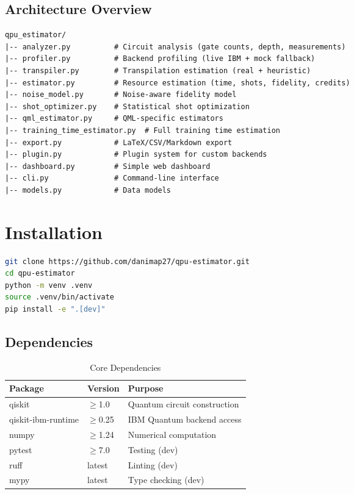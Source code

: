 \documentclass[11pt,a4paper]{article}
\begin{document}
\subsection{Architecture Overview}

\begin{lstlisting}[language=TeX,caption=Package Structure]
qpu_estimator/
|-- analyzer.py          # Circuit analysis (gate counts, depth, measurements)
|-- profiler.py          # Backend profiling (live IBM + mock fallback)
|-- transpiler.py        # Transpilation estimation (real + heuristic)
|-- estimator.py         # Resource estimation (time, shots, fidelity, credits)
|-- noise_model.py       # Noise-aware fidelity model
|-- shot_optimizer.py    # Statistical shot optimization
|-- qml_estimator.py     # QML-specific estimators
|-- training_time_estimator.py  # Full training time estimation
|-- export.py            # LaTeX/CSV/Markdown export
|-- plugin.py            # Plugin system for custom backends
|-- dashboard.py         # Simple web dashboard
|-- cli.py               # Command-line interface
|-- models.py            # Data models
\end{lstlisting}

\section{Installation}

\begin{lstlisting}[language=bash,caption=Installation from Source]
git clone https://github.com/danimap27/qpu-estimator.git
cd qpu-estimator
python -m venv .venv
source .venv/bin/activate
pip install -e ".[dev]"
\end{lstlisting}

\subsection{Dependencies}

\begin{table}[htbp]
\centering
\caption{Core Dependencies}
\begin{tabular}{@{}lll@{}}
\toprule
\textbf{Package} & \textbf{Version} & \textbf{Purpose} \\
\midrule
qiskit & $\geq$1.0 & Quantum circuit construction \\
qiskit-ibm-runtime & $\geq$0.25 & IBM Quantum backend access \\
numpy & $\geq$1.24 & Numerical computation \\
pytest & $\geq$7.0 & Testing (dev) \\
ruff & latest & Linting (dev) \\
mypy & latest & Type checking (dev) \\
\bottomrule
\end{tabular}
\end{table}
\end{document}
